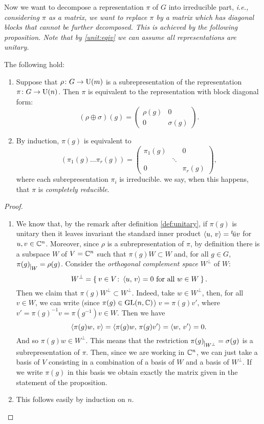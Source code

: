 Now we want to decompose a representation $\pi$ of $G$ into irreducible part, \it{i.e.}, considering $\pi$ as a matrix, we want to replace $\pi$ by a matrix which has diagonal blocks that cannot be further decomposed. This is achieved by the following proposition.
Note that by \ref{unit:eqiv} we can assume all representations are unitary.
\begin{prop} The following hold:
\begin{enumerate}
\item Suppose that $\rho\colon G\rightarrow \operatorname{U}(m)$ is a subrepresentation of the representation $\pi\colon G\rightarrow \operatorname{U}(n)$. Then $\pi$ is equivalent to the representation with block diagonal form:
\[(\rho \oplus \sigma)(g)=
\begin{pmatrix}
\rho(g) & 0 \\
0 		& \sigma(g)
\end{pmatrix}.
\]
\item By induction, $\pi(g)$ is equivalent to
\[
(\pi_1(g)\dots \pi_r(g))= 
\begin{pmatrix}
\pi_1(g)  &{} &0\\
{} &\ddots &{} \\
0 &{}  &\pi_r(g)
\end{pmatrix},
\]
where each subrepresentation $\pi_i$  is irreducible. we say, when this happens, that $\pi$ is \emph{completely reducible}. 
\end{enumerate}
\end{prop}
\begin{proof}
\begin{enumerate}
\item We know that, by the remark after definition \ref{def:unitary}, if $\pi(g)$ is unitary then it leaves invariant the standard inner product $\braket{u,\, v}={}^t\!\bar{u}v$ for $u,v \in {\mathbb C}^n$. Moreover, since $\rho$ is a subrepresentation of $\pi$, by definition there is a subspace $W$ of $V={\mathbb C}^n$ such that $\pi(g)W\subset W$ and, for all $g\in G$, $\pi(g)_{\mkern 1mu \vrule height 2ex\mkern2mu W}= \rho(g)$.  Consider the \emph{orthogonal complement space} $W^\perp$ of $W$:
\[
W^{\perp}= \Set{v \in V \colon \braket{u, \, v}=0 \text{ for all } w \in W}.
\]
Then we claim that $\pi(g)W^{\perp}\subset W^{\perp}$. Indeed, take $w\in W^{\perp}$, then, for all $v\in W$, we can write (since $\pi(g) \in \operatorname{GL}(n,{\mathbb C})$) $v=\pi(g)v'$, where $v'=\pi(g)^{-1}v=\pi(g^{-1})v \in W$. Then we have 
\[
\braket{\pi(g)w,\, v}=\braket{\pi(g)w,\, \pi(g)v'}=\braket{w,\, v'}=0.
\]
And so $\pi(g)w\in W^{\perp}$. This means that the restriction $\pi(g)_{\mkern 1mu \vrule height 2ex\mkern2mu W^{\perp}}= \sigma(g)$ is a subrepresentation of $\pi$.  Then, since we are working in ${\mathbb C}^n$, we can just take a basis of $V$ consisting in a combination of a basis of $W$ and a basis of $W^{\perp}$. If we write $\pi(g)$ in this basis we obtain exactly the matrix given in the statement of the proposition.
\item This follows easily by induction on $n$.
\end{enumerate}
\end{proof}

